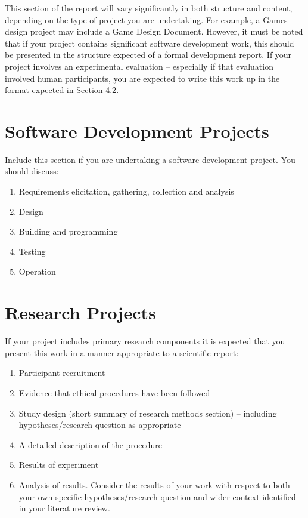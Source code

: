 This section of the report will vary significantly in both structure and content, depending on the type of project you are undertaking. For example, a Games design project may include a Game Design Document. However, it must be noted that if your project contains significant software development work, this should be presented in the structure expected of a formal development report. If your project involves an experimental evaluation – especially if that evaluation involved human participants, you are expected to write this work up in the format expected in \hyperref[sec:research]{Section 4.2}. 

\section{Software Development Projects}
Include this section if you are undertaking a software development project. You should discuss:

\begin{enumerate}
    \item Requirements elicitation, gathering, collection and analysis
    \item Design
    \item Building and programming
    \item Testing
    \item Operation
\end{enumerate}

\section{Research Projects}
\label{sec:research}
If your project includes primary research components it is expected that you present this work in a manner appropriate to a scientific report:

\begin{enumerate}
    \item Participant recruitment
    \item Evidence that ethical procedures have been followed
    \item Study design (short summary of research methods section) – including hypotheses/research question as appropriate
    \item A detailed description of the procedure
    \item Results of experiment
    \item  Analysis of results. Consider the results of your work with respect to both your own specific hypotheses/research question and wider context identified in your literature review.

\end{enumerate}

